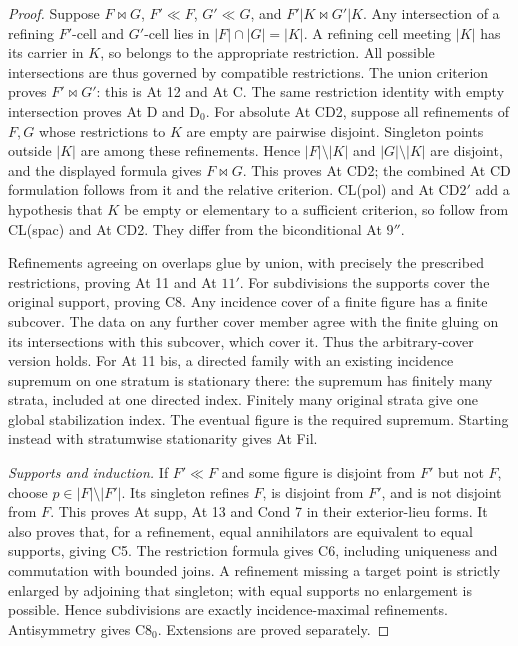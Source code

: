 \begin{proof}
Suppose \(F\bowtie G\), \(F'\ll F\), \(G'\ll G\),
and \(F'|K\bowtie G'|K\). Any intersection
of a refining \(F'\)-cell and \(G'\)-cell
lies in \(|F|\cap|G|=|K|\). A refining cell
meeting \(|K|\) has its carrier in \(K\),
so belongs to the appropriate restriction.
All possible intersections are thus governed
by compatible restrictions. The union
criterion proves \(F'\bowtie G'\):
this is At 12 and At C.
The same restriction identity with
empty intersection proves At D and D\(_0\).
For absolute At CD2, suppose all refinements
of \(F,G\) whose restrictions to \(K\) are empty
are pairwise disjoint. Singleton points outside
\(|K|\) are among these refinements. Hence
\(|F|\setminus|K|\) and \(|G|\setminus|K|\)
are disjoint, and the displayed formula
gives \(F\bowtie G\). This proves At CD2;
the combined At CD formulation follows
from it and the relative criterion.
CL(pol) and At CD2\( '\) add a hypothesis
that \(K\) be empty or elementary to a
sufficient criterion, so follow from
CL(spac) and At CD2. They differ from
the biconditional At \(9''\).

Refinements agreeing on overlaps glue
by union, with precisely the prescribed
restrictions, proving At 11 and At \(11'\).
For subdivisions the supports cover the
original support, proving C8.
Any incidence cover of a finite figure
has a finite subcover. The data on
any further cover member agree with
the finite gluing on its intersections
with this subcover, which cover it.
Thus the arbitrary-cover version holds.
For At 11 bis, a directed family
with an existing incidence supremum
on one stratum is stationary there:
the supremum has finitely many
strata, included at one directed index.
Finitely many original strata give
one global stabilization index.
The eventual figure is the required
supremum. Starting instead with
stratumwise stationarity gives At Fil.

\emph{Supports and induction.}
If \(F'\ll F\) and some figure is disjoint
from \(F'\) but not \(F\), choose
\(p\in|F|\setminus|F'|\). Its singleton
refines \(F\), is disjoint from \(F'\),
and is not disjoint from \(F\).
This proves At supp, At 13 and
Cond 7 in their exterior-lieu forms.
It also proves that, for a refinement,
equal annihilators are equivalent to
equal supports, giving C5.
The restriction formula gives C6,
including uniqueness and commutation
with bounded joins. A refinement
missing a target point is strictly
enlarged by adjoining that singleton;
with equal supports no enlargement
is possible. Hence subdivisions are
exactly incidence-maximal refinements.
Antisymmetry gives C8\(_0\).
Extensions are proved separately.


\end{proof}
